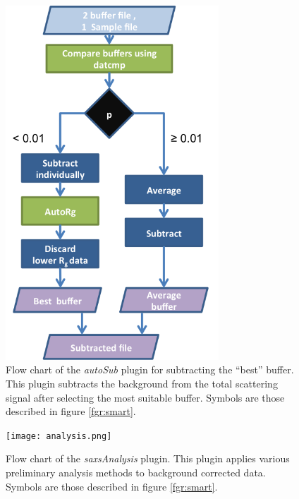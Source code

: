 \documentclass[preprint,pdf]{iucr}              %
\begin{document}
\begin{figure}
\centering
\includegraphics[width=8cm]{autosub.png}%
\caption{Flow chart of the \textit{autoSub} plugin for subtracting the ``best''
buffer.
This plugin subtracts the background from the total scattering signal after
selecting the most suitable buffer.
Symbols are those described in figure \ref{fgr:smart}.}
\label{fgr:autosub}
\end{figure}

\begin{figure}
\centering
\texttt{[image: analysis.png]}%
\caption{Flow chart of the \textit{saxsAnalysis} plugin.
This plugin applies various preliminary analysis methods to background
corrected data.
Symbols are those described in figure \ref{fgr:smart}.}
\label{fgr:analysis}
\end{figure}
\end{document}
